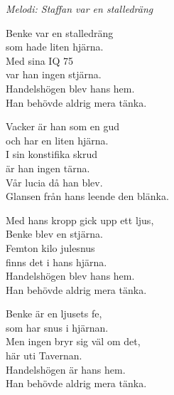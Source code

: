 {\footnotesize\textit{Melodi: Staffan var en stalledräng}}\par
\vspace{10pt}
Benke var en stalledräng\\
som hade liten hjärna.\\
Med sina IQ 75\\
var han ingen stjärna.\\
Handelshögen blev hans hem.\\
Han behövde aldrig mera tänka.\par
\vspace{10pt}
Vacker är han som en gud\\
och har en liten hjärna.\\
I sin konstifika skrud\\
är han ingen tärna.\\
Vår lucia då han blev.\\
Glansen från hans leende den blänka.\par
\vspace{10pt}
Med hans kropp gick upp ett ljus,\\
Benke blev en stjärna.\\
Femton kilo julesnus\\
finns det i hans hjärna.\\
Handelshögen blev hans hem.\\
Han behövde aldrig mera tänka.\par
\vspace{10pt}
Benke är en ljusets fe,\\
som har snus i hjärnan.\\
Men ingen bryr sig väl om det,\\
här uti Tavernan.\\
Handelshögen är hans hem.\\
Han behövde aldrig mera tänka.
